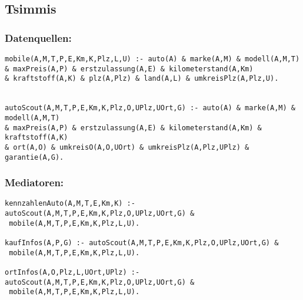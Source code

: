 \documentclass[a4paper]{article}
\begin{document}
\subsection*{Tsimmis}
\subsubsection*{Datenquellen:}
\begin{verbatim}
mobile(A,M,T,P,E,Km,K,Plz,L,U) :- auto(A) & marke(A,M) & modell(A,M,T) 
& maxPreis(A,P) & erstzulassung(A,E) & kilometerstand(A,Km) 
& kraftstoff(A,K) & plz(A,Plz) & land(A,L) & umkreisPlz(A,Plz,U).


autoScout(A,M,T,P,E,Km,K,Plz,O,UPlz,UOrt,G) :- auto(A) & marke(A,M) & modell(A,M,T) 
& maxPreis(A,P) & erstzulassung(A,E) & kilometerstand(A,Km) & kraftstoff(A,K) 
& ort(A,O) & umkreisO(A,O,UOrt) & umkreisPlz(A,Plz,UPlz) & garantie(A,G).

\end{verbatim}

\subsubsection*{Mediatoren:}
\begin{verbatim}
kennzahlenAuto(A,M,T,E,Km,K) :- autoScout(A,M,T,P,E,Km,K,Plz,O,UPlz,UOrt,G) &
 mobile(A,M,T,P,E,Km,K,Plz,L,U).

kaufInfos(A,P,G) :- autoScout(A,M,T,P,E,Km,K,Plz,O,UPlz,UOrt,G) &
 mobile(A,M,T,P,E,Km,K,Plz,L,U).

ortInfos(A,O,Plz,L,UOrt,UPlz) :- autoScout(A,M,T,P,E,Km,K,Plz,O,UPlz,UOrt,G) &
 mobile(A,M,T,P,E,Km,K,Plz,L,U).

\end{verbatim}
\end{document}
